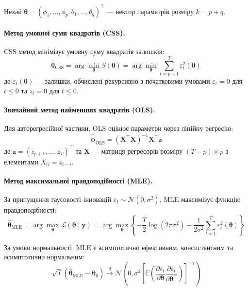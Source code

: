 \documentclass[12pt,a4paper]{article}
\begin{document}
	Нехай $\boldsymbol{\theta} = (\phi_1, \ldots, \phi_p, \theta_1, \ldots, \theta_q)^\top$ --- вектор параметрів розміру $k = p + q$.
	
	\paragraph{Метод умовної суми квадратів (CSS).}
	
	CSS метод мінімізує умовну суму квадратів залишків:
	\begin{equation}
		\label{eq:css}
		\hat{\boldsymbol{\theta}}_{\text{CSS}} = \arg\min_{\boldsymbol{\theta}} S(\boldsymbol{\theta}) = \arg\min_{\boldsymbol{\theta}} \sum_{t=p+1}^{T} \varepsilon_t^2(\boldsymbol{\theta})
	\end{equation}
	де $\varepsilon_t(\boldsymbol{\theta})$ --- залишки, обчислені рекурсивно з початковими умовами $\varepsilon_t = 0$ для $t \leq 0$ та $z_t = 0$ для $t \leq 0$.
	
	\paragraph{Звичайний метод найменших квадратів (OLS).}
	
	Для авторегресійної частини, OLS оцінює параметри через лінійну регресію:
	\begin{equation}
		\label{eq:ols}
		\hat{\boldsymbol{\phi}}_{\text{OLS}} = (\mathbf{X}^\top \mathbf{X})^{-1} \mathbf{X}^\top \mathbf{z}
	\end{equation}
	де $\mathbf{z} = (z_{p+1}, \ldots, z_T)^\top$ та $\mathbf{X}$ --- матриця регресорів розміру $(T-p) \times p$ з елементами $X_{ti} = z_{t-i}$.
	
	\paragraph{Метод максимальної правдоподібності (MLE).}
	
	За припущення гаусовості інновацій $\varepsilon_t \sim \mathcal{N}(0, \sigma^2)$, MLE максимізує функцію правдоподібності:
	\begin{equation}
		\label{eq:mle}
		\hat{\boldsymbol{\theta}}_{\text{MLE}} = \arg\max_{\boldsymbol{\theta}} \mathcal{L}(\boldsymbol{\theta} \mid \mathbf{y}) = \arg\max_{\boldsymbol{\theta}} \left\{ -\frac{T}{2} \log(2\pi\sigma^2) - \frac{1}{2\sigma^2} \sum_{t=1}^{T} \varepsilon_t^2(\boldsymbol{\theta}) \right\}
	\end{equation}
	
	За умови нормальності, MLE є асимптотично ефективним, консистентним та асимптотично нормальним:
	\begin{equation}
		\label{eq:mle_asymptotic}
		\sqrt{T}(\hat{\boldsymbol{\theta}}_{\text{MLE}} - \boldsymbol{\theta}_0) \xrightarrow{d} \mathcal{N}\left(0, \sigma^2 \left[\mathbb{E}\left(\frac{\partial \varepsilon_t}{\partial \boldsymbol{\theta}} \frac{\partial \varepsilon_t}{\partial \boldsymbol{\theta}^\top}\right)\right]^{-1}\right)
	\end{equation}
	
\end{document}
